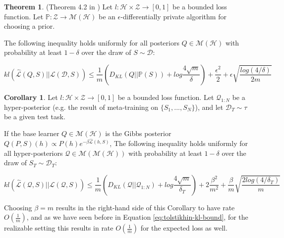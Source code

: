 \documentclass{article}
\theoremstyle{definition}
\newtheorem{theorem}{Theorem}[section]
\newtheorem{corollary}{Corollary}[section]
\begin{document}
\begin{theorem} (Theorem 4.2 in \citet{Dziugaite2018})
	Let $l:\mathcal{H}\times \mathcal{Z}\rightarrow [0,1]$ be a bounded loss function.
	Let $\mathbb{P}:\mathcal{Z}\rightarrow \mathcal{M}(\mathcal{H})$ be an $\epsilon$-differentially private algorithm for choosing a prior.
	
	The following inequality holds uniformly for all posteriors $Q\in \mathcal{M}(\mathcal{H})$ with probability at least $1-\delta$ over the draw of $S\sim \mathcal{D}$:
	
	$$kl(\hat{\mathcal{L}}(Q,S)||\mathcal{L}(\mathcal{D},S))\leq \frac{1}{m}\left (D_{KL}(Q||\mathbb{P}(S))+log\frac{4\sqrt{m}}{\delta} \right ) +\frac{\epsilon^2}{2}+\epsilon\sqrt{\frac{log (4/\delta)}{2m}} $$

\end{theorem}

\begin{corollary} \label{thm:kl-main-result}
	Let $l:\mathcal{H}\times \mathcal{Z}\rightarrow [0,1]$ be a bounded loss function.
	Let $\mathcal{Q}_{1:N}$ be a hyper-posterior (e.g. the result of meta-training on $\{S_1,...,S_N\}$), and let $\mathcal{D}_T\sim \tau$ be a given test task. 
	
	If the base learner $Q\in \mathcal{M}(\mathcal{H})$ is the Gibbs posterior $Q(P, S)(h)\propto P(h)e^{-\beta\hat{\mathcal{L}}(h, S)}$, 
	The following inequality holds uniformly for all hyper-posteriors $\mathcal{Q}\in \mathcal{M}(\mathcal{M}(\mathcal{H}))$ with probability at least $1-\delta$ over the draw of $S_T\sim \mathcal{D}_T$:
	
	$$kl(\hat{\mathcal{L}}(\mathcal{Q},S)||\mathcal{L}(\mathcal{Q},S))\leq \frac{1}{m}\left (D_{KL}(\mathcal{Q}||\mathcal{Q}_{1:N})+log\frac{4\sqrt{m}}{\delta_T} \right ) +2\frac{\beta^2}{m^2}+\frac{\beta}{m}\sqrt{\frac{2log (4/\delta_T)}{m}} $$
	
\end{corollary}

Choosing $\beta=m$ results in the right-hand side of this Corollary to have rate $O\left (\frac{1}{m}\right )$, and as we have seen before in Equation \ref{eq:tolstikhin-kl-bound}, for the realizable setting this results in rate $O\left (\frac{1}{m}\right )$ for the expected loss as well.

\end{document}
